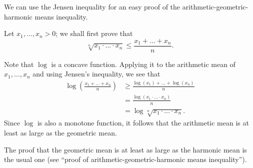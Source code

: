 \documentclass[12pt]{article}
\begin{document}
We can use the Jensen inequality for an easy proof of the arithmetic-geometric-harmonic means inequality.

Let $x_1,\ldots,x_n > 0$; we shall first prove that
$$
\sqrt[n]{x_1\cdot\ldots\cdot x_n} \le \frac{x_1+\ldots+x_n}{n}.
$$

Note that $\log$ is a concave function. Applying it to the
arithmetic mean of $x_1,\ldots, x_n$ and using Jensen's inequality, we see that
\begin{align*}
\log(\frac{x_1+\ldots+x_n}{n})&\geq\frac{\log(x_1)+\ldots+\log(x_n)}{n}\\
&=\frac{\log(x_1\cdot\ldots\cdot x_n)}{n}\\
&=\log{\sqrt[n]{x_1\cdot\ldots\cdot x_n}}.
\end{align*}
Since $\log$ is also a monotone function, it follows that the arithmetic mean is at least as large as the geometric mean.

The proof that the geometric mean is at least as large as the harmonic mean is the usual one (see ``proof of arithmetic-geometric-harmonic means inequality'').
\end{document}

